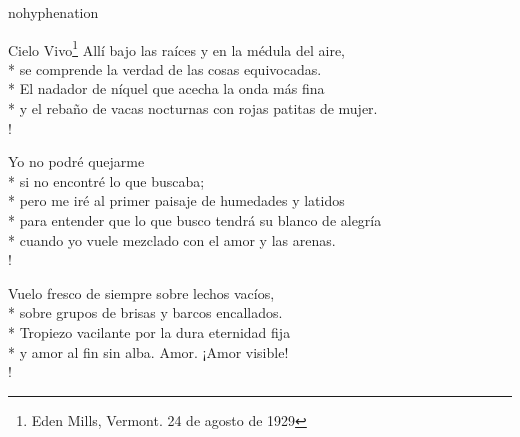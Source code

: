 \documentclass[
    a5paper,
    DIV=10,
    12pt,
    notitlepage,
    oneside,]
{scrbook} %
\begin{document}
\begin{hyphenrules}{nohyphenation}
\begin{poem}{Cielo Vivo}{\footnote{Eden Mills, Vermont. 24 de agosto de 1929}}{\vspace{-1em}}
Allí bajo las raíces y en la médula del aire,\\*
se comprende la verdad de las cosas equivocadas.\\*
El nadador de níquel que acecha la onda más fina\\*
y el rebaño de vacas nocturnas con rojas patitas de mujer.\\!

Yo no podré quejarme\\*
si no encontré lo que buscaba;\\*
pero me iré al primer paisaje de humedades y latidos\\*
para entender que lo que busco tendrá su blanco de alegría\\*
cuando yo vuele mezclado con el amor y las arenas.\\!

Vuelo fresco de siempre sobre lechos vacíos,\\*
sobre grupos de brisas y barcos encallados.\\*
Tropiezo vacilante por la dura eternidad fija\\*
y amor al fin sin alba. Amor. ¡Amor visible! \\!

\end{poem}


\end{hyphenrules}
\end{document}
